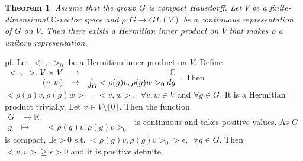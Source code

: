 \documentclass[12pt,letterpaper]{report}
\newtheorem{theorem}{Theorem}[section]
\begin{document}
\begin{theorem}Assume that the group $G$ is compact Hausdorff. Let $V$ be a finite-dimensional $\mathbb{C}$-vector space and $\rho:G\rightarrow GL(V)$ be a continuous representation of $G$ on $V$. Then there exists a Hermitian inner product on $V$ that makes $\rho$ a unitary representation.\end{theorem}
pf. Let $<\cdot,\cdot>_{0}$ be a Hermitian inner product on $V$. Define $\\\begin{array}{rrr}<\cdot,\cdot>:V\times V&\rightarrow&\mathbb{C}\\(v,w)&\mapsto&\int_{G}<\rho(g)v,\rho(g)w>_{0}dg\end{array}$. Then $<\rho(g)v,\rho(g)w>=<v,w>,\,\,\,\forall v,w\in V$ and $\forall g\in G$. It is a Hermitian product trivially. Let $v\in V\setminus\{0\}$. Then the function $\begin{array}{rrr}G&\rightarrow\mathbb{R}\\g&\mapsto&<\rho(g)v,\rho(g)v>_{0}\end{array}$ is continuous and takes positive values. As $G$ is compact, $\exists \epsilon>0$ s.t. $<\rho(g)v,\rho(g)v>_{0}>\epsilon,\,\,\,\forall g\in G$. Then $<v,v>\geq\epsilon>0$ and it is positive definite. 
\end{document}
